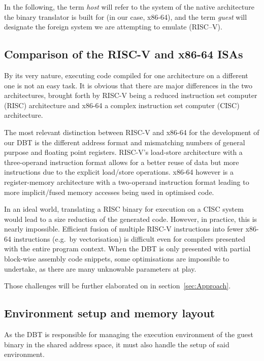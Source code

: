 In the following, the term \textit{host} will refer to the system of the native architecture the binary translator is built for (in our case, x86-64), and the term \textit{guest} will designate the foreign system we are attempting to emulate (RISC--V).

\subsection{Comparison of the RISC-V and x86-64 ISAs}
\label{sec:isa-cmp}
By its very nature, executing code compiled for one architecture on a different one is not an easy task.
It is obvious that there are major differences in the two architectures, brought forth by RISC-V being a reduced instruction set computer (RISC) architecture and x86-64 a complex instruction set computer (CISC) architecture.

The most relevant distinction between RISC-V and x86-64 for the development of our DBT is the different address format and mismatching numbers of general purpose and floating point registers.
RISC-V's load-store architecture with a three-operand instruction format allows for a better reuse of data but more instructions due to the explicit load/store operations.
x86-64 however is a register-memory architecture with a two-operand instruction format leading to more implicit/fused memory accesses being used in optimised code.

In an ideal world, translating a RISC binary for execution on a CISC system would lead to a size reduction of the generated code.
However, in practice, this is nearly impossible.
Efficient fusion of multiple RISC-V instructions into fewer x86-64 instructions (e.g.\ by vectorisation) is difficult even for compilers presented with the entire program context.
When the DBT is only presented with partial block-wise assembly code snippets, some optimisations are impossible to undertake, as there are many unknowable parameters at play.

Those challenges will be further elaborated on in section~\ref{sec:Approach}.

\subsection{Environment setup and memory layout}
\label{sec:memory-layout}
As the DBT is responsible for managing the execution environment of the guest binary in the shared address space, it must also handle the setup of said environment.

